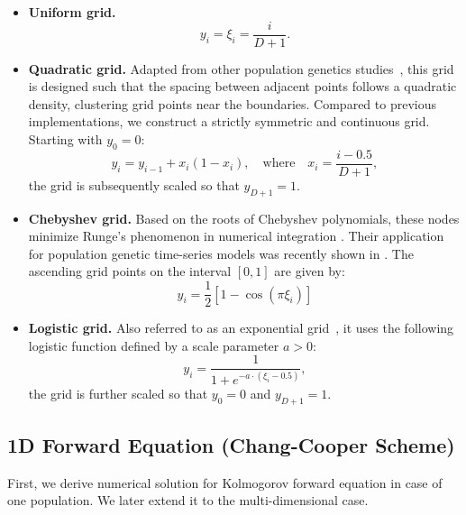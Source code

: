 \documentclass{article}
\begin{document}
\begin{itemize}
    \item \textbf{Uniform grid.} 
    \begin{equation*}
        y_i = \xi_i = \frac{i}{D+1}.
    \end{equation*}
    
    \item \textbf{Quadratic grid.}
    Adapted from other population genetics studies~\citep{gutenkunst2009, malaspinas2012, ferrer2016}, this grid is designed such that the spacing between adjacent points follows a quadratic density, clustering grid points near the boundaries. 
    Compared to previous implementations, we construct a strictly symmetric and continuous grid.
    Starting with $y_0=0$:
    \begin{equation*}
        y_i = y_{i-1} + x_i(1-x_i), \quad \text{where} \quad x_i = \frac{i - 0.5}{D+1},
    \end{equation*}
    the grid is subsequently scaled so that $y_{D+1} = 1$.

    \item \textbf{Chebyshev grid.} Based on the roots of Chebyshev polynomials, these nodes minimize Runge's phenomenon in numerical integration \citep{mathews2004}. Their application for population genetic time-series models was recently shown in \citet{fine2025}.
    The ascending grid points on the interval $[0,1]$ are given by:
    \begin{equation*}
        y_i = \frac{1}{2} \left[ 1 - \cos\left(\pi \xi_i\right) \right]
    \end{equation*}

    \item \textbf{Logistic grid.} Also referred to as an exponential grid~\citep{malaspinas2012}, it uses the following logistic function defined by a scale parameter $a > 0$:
    \begin{equation*}
        {y}_i = \frac{1}{1 + e^{-a \cdot (\xi_i - 0.5)}},
    \end{equation*}
    the grid is further scaled so that $y_0 = 0$ and $y_{D+1} = 1$.
\end{itemize}


\subsection{1D Forward Equation (Chang-Cooper Scheme)}
First, we derive numerical solution for Kolmogorov forward equation in case of one population.
We later extend it to the multi-dimensional case.
\end{document}
